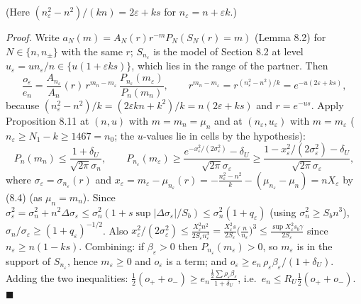 (Here \((n_\varepsilon^2-n^2)/(kn)=2\varepsilon+ks\) for \(n_\varepsilon=n+\varepsilon k\).)

\emph{Proof.} Write \(a_N(m)=A_N(r)r^{-m}P_N(S_N(r)=m)\) (Lemma 8.2) for \(N\in\{n,n_\pm\}\) with the same \(r\); \(S_{n_\varepsilon}\) is the model of Section 8.2 at level \(u_\varepsilon=un_\varepsilon/n\in\{u(1+\varepsilon ks)\}\), which lies in the range of the partner. Then
\[\frac{o_\varepsilon}{e_n}=\frac{A_{n_\varepsilon}}{A_n}(r)\,r^{m_n-m_\varepsilon}\,\frac{P_{n_\varepsilon}(m_\varepsilon)}{P_n(m_n)},\qquad r^{m_n-m_\varepsilon}=r^{(n_\varepsilon^2-n^2)/k}=e^{-u(2\varepsilon+ks)},\]
because \((n_\varepsilon^2-n^2)/k=(2\varepsilon kn+k^2)/k=n(2\varepsilon+ks)\) and \(r=e^{-us}\). Apply Proposition 8.11 at \((n,u)\) with \(m=m_n=\mu_n\) and at \((n_\varepsilon,u_\varepsilon)\) with \(m=m_\varepsilon\) (\(n_\varepsilon\ge N_1-k\ge1467=n_0\); the \(u\)-values lie in cells by the hypothesis):
\[P_n(m_n)\le\frac{1+\delta_U}{\sqrt{2\pi}\sigma_n},\qquad P_{n_\varepsilon}(m_\varepsilon)\ge\frac{e^{-x_\varepsilon^2/(2\sigma_\varepsilon^2)}-\delta_U}{\sqrt{2\pi}\sigma_\varepsilon}\ge\frac{1-x_\varepsilon^2/(2\sigma_\varepsilon^2)-\delta_U}{\sqrt{2\pi}\sigma_\varepsilon},\]
where \(\sigma_\varepsilon=\sigma_{n_\varepsilon}(r)\) and \(x_\varepsilon=m_\varepsilon-\mu_{n_\varepsilon}(r)=-\frac{n_\varepsilon^2-n^2}k-(\mu_{n_\varepsilon}-\mu_n)=n X_\varepsilon\) by (8.4) (as \(\mu_n=m_n\)). Since \(\sigma_\varepsilon^2=\sigma_n^2+n^2\Delta\sigma_\varepsilon\le\sigma_n^2(1+s\sup|\Delta\sigma_\varepsilon|/S_b)\le\sigma_n^2(1+q_\varepsilon)\) (using \(\sigma_n^2\ge S_bn^3\)), \(\sigma_n/\sigma_\varepsilon\ge(1+q_\varepsilon)^{-1/2}\). Also \(x_\varepsilon^2/(2\sigma_\varepsilon^2)\le\frac{X_\varepsilon^2n^2}{2S_\varepsilon n_\varepsilon^3}=\frac{X_\varepsilon^2 s}{2S_\varepsilon}\bigl(\frac n{n_\varepsilon}\bigr)^3\le\frac{\sup X_\varepsilon^2s_b\gamma}{2S_\varepsilon}\) since \(n_\varepsilon\ge n(1-ks)\). Combining: if \(\beta_\varepsilon>0\) then \(P_{n_\varepsilon}(m_\varepsilon)>0\), so \(m_\varepsilon\) is in the support of \(S_{n_\varepsilon}\), hence \(m_\varepsilon\ge0\) and \(o_\varepsilon\) is a term; and \(o_\varepsilon\ge e_n\,\rho_\varepsilon\beta_\varepsilon/(1+\delta_U)\). Adding the two inequalities: \(\frac12(o_++o_-)\ge e_n\frac{\frac12\sum\rho_\varepsilon\beta_\varepsilon}{1+\delta_U}\), i.e.~\(e_n\le R_U\frac12(o_++o_-)\). \(\blacksquare\)


